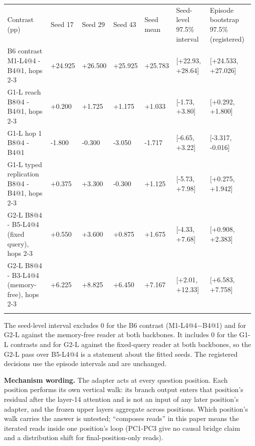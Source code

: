 {\footnotesize
\setlength{\tabcolsep}{3pt}
\begin{longtable}{W{286}{14}W{103}{14}W{103}{14}W{103}{14}W{103}{14}W{137}{14}W{164}{14}}
\toprule
Contrast (pp) & Seed 17 & Seed 29 & Seed 43 & Seed mean & Seed-level 97.5\% interval & Episode bootstrap 97.5\% (registered) \\ \addlinespace[3pt]
\midrule \endhead
B6 contrast M1-L4@4 - B4@1, hops 2-3 & +24.925 & +26.500 & +25.925 & +25.783 & [+22.93, +28.64] & [+24.533, +27.026] \\ \addlinespace[3pt]
G1-L reach B8@4 - B4@1, hops 2-3 & +0.200 & +1.725 & +1.175 & +1.033 & [-1.73, +3.80] & [+0.292, +1.800] \\ \addlinespace[3pt]
G1-L hop 1 B8@4 - B4@1 & -1.800 & -0.300 & -3.050 & -1.717 & [-6.65, +3.22] & [-3.317, -0.016] \\ \addlinespace[3pt]
G1-L typed replication B8@4 - B4@1, hops 2-3 & +0.375 & +3.300 & -0.300 & +1.125 & [-5.73, +7.98] & [+0.275, +1.942] \\ \addlinespace[3pt]
G2-L B8@4 - B5-L4@4 (fixed query), hops 2-3 & +0.550 & +3.600 & +0.875 & +1.675 & [-4.33, +7.68] & [+0.908, +2.383] \\ \addlinespace[3pt]
G2-L B8@4 - B3-L4@4 (memory-free), hops 2-3 & +6.225 & +8.825 & +6.450 & +7.167 & [+2.01, +12.33] & [+6.583, +7.758] \\ \addlinespace[3pt]
\bottomrule
\end{longtable}
}


The seed-level interval excludes 0 for the B6 contrast (M1-L4@4\ensuremath{-}B4@1) and for G2-L against the memory-free reader at both backbones. It includes 0 for the
G1-L contrasts and for G2-L against the fixed-query reader at both backbones, so the G2-L pass over B5-L4@4 is a statement about the fitted seeds. The
registered decisions use the episode intervals and are unchanged.  %

\textbf{Mechanism wording.} The adapter acts at every question position. Each position performs its own vertical walk: its branch output enters that
position’s residual after the layer-14 attention and is not an input of any later position’s adapter, and the frozen upper layers aggregate across positions.
Which position’s walk carries the answer is untested; “composes reads” in this paper means the iterated reads inside one position’s loop (PC1-PC3 give
no causal bridge claim and a distribution shift for final-position-only reads).  %

